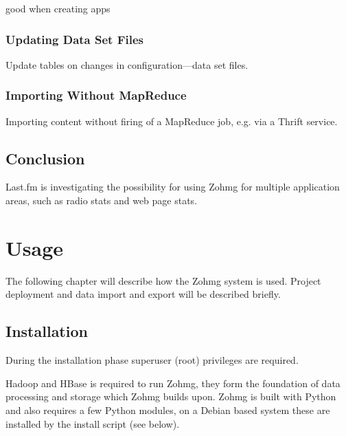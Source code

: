 good when creating apps


\subsection*{Updating Data Set Files}

Update tables on changes in configuration---data set files.


\subsection*{Importing Without MapReduce}

Importing content without firing of a MapReduce job, e.g. via a Thrift
service.



\section{Conclusion}

Last.fm is investigating the possibility for using Zohmg for multiple
application areas, such as radio stats and web page stats.


\pagebreak



 



\appendix



\chapter{Usage}


\noindent The following chapter will describe how the Zohmg system is used.
Project deployment and data import and export will be described briefly.


\section*{Installation}

During the installation phase superuser (root) privileges are required.

Hadoop and HBase is required to run Zohmg, they form the foundation of data
processing and storage which Zohmg builds upon. Zohmg is built with Python and
also requires a few Python modules, on a Debian based system these are installed
by the install script (see below).

